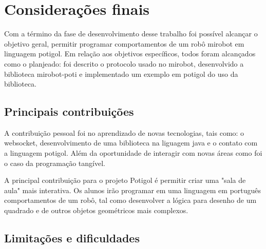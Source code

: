 \chapter{Considerações finais}
\label{cap:consideracoes}



Com a término da fase de desenvolvimento desse trabalho foi possível alcançar o
objetivo geral, permitir programar comportamentos de
um robô mirobot em linguagem potigol. 
Em relação aos objetivos específicos, todos foram
alcançados como o planjeado: foi descrito o protocolo usado no mirobot,
desenvolvido a biblioteca mirobot-poti e implementado um exemplo em potigol do
uso da biblioteca.


\section{Principais contribuições}

A contribuição pessoal foi no aprendizado de novas tecnologias, tais como: o websocket, desenvolvimento de uma biblioteca na liguagem java e o contato com a linguagem potigol. Além da oportunidade de interagir com novas áreas como foi o caso da programação tangível. 

A principal contribuição para o projeto Potigol é permitir criar uma "sala de aula" mais interativa.
Os alunos irão programar em uma linguagem em português comportamentos de um robô, tal como desenvolver a lógica para desenho de um quadrado e de outros objetos geométricos mais complexos.

\section{Limitações e dificuldades}

